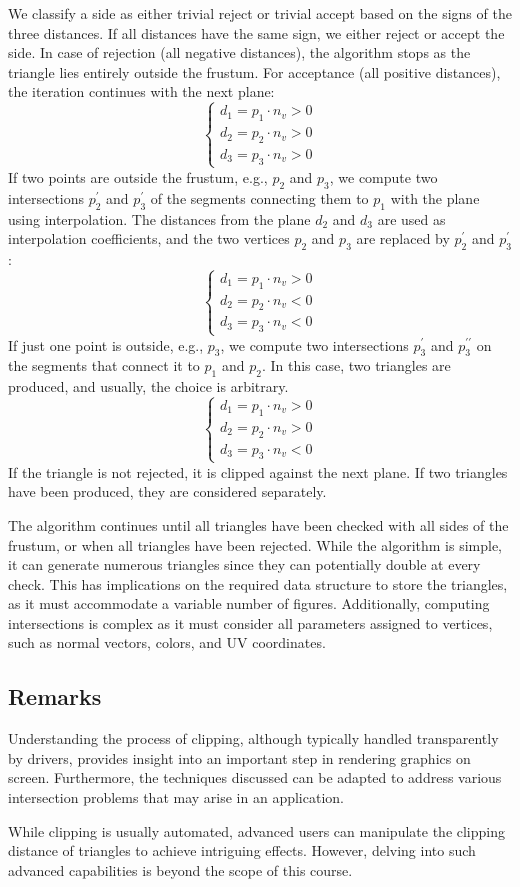 We classify a side as either trivial reject or trivial accept based on the signs of the three distances. 
If all distances have the same sign, we either reject or accept the side. 
In case of rejection (all negative distances), the algorithm stops as the triangle lies entirely outside the frustum. 
For acceptance (all positive distances), the iteration continues with the next plane:
\[\begin{cases}
    d_1=p_1\cdot n_v>0 \\
    d_2=p_2\cdot n_v>0 \\
    d_3=p_3\cdot n_v>0 
\end{cases}\]
If two points are outside the frustum, e.g., $p_2$ and $p_3$, we compute two intersections $p_2^\prime$ and $p_3^\prime$ of the segments connecting them to $p_1$ with the plane using interpolation. 
The distances from the plane $d_2$ and $d_3$ are used as interpolation coefficients, and the two vertices $p_2$ and $p_3$ are replaced by $p_2^\prime$ and $p_3^\prime$: 
\[\begin{cases}
    d_1=p_1\cdot n_v>0 \\
    d_2=p_2\cdot n_v<0 \\
    d_3=p_3\cdot n_v<0 
\end{cases}\]
If just one point is outside, e.g., $p_3$, we compute two intersections $p_3^\prime$ and $p_3^{\prime\prime}$ on the segments that connect it to $p_1$ and $p_2$. 
In this case, two triangles are produced, and usually, the choice is arbitrary.
\[\begin{cases}
    d_1=p_1\cdot n_v>0 \\
    d_2=p_2\cdot n_v>0 \\
    d_3=p_3\cdot n_v<0 
\end{cases}\]
If the triangle is not rejected, it is clipped against the next plane. 
If two triangles have been produced, they are considered separately.

The algorithm continues until all triangles have been checked with all sides of the frustum, or when all triangles have been rejected.
While the algorithm is simple, it can generate numerous triangles since they can potentially double at every check. 
This has implications on the required data structure to store the triangles, as it must accommodate a variable number of figures.
Additionally, computing intersections is complex as it must consider all parameters assigned to vertices, such as normal vectors, colors, and UV coordinates.

\subsection{Remarks}
Understanding the process of clipping, although typically handled transparently by drivers, provides insight into an important step in rendering graphics on screen. 
Furthermore, the techniques discussed can be adapted to address various intersection problems that may arise in an application.

While clipping is usually automated, advanced users can manipulate the clipping distance of triangles to achieve intriguing effects. 
However, delving into such advanced capabilities is beyond the scope of this course.